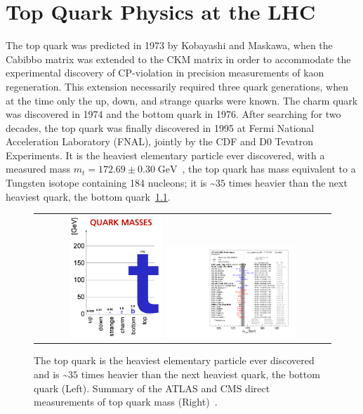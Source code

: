 
\chapter{Top Quark Physics at the LHC}
\label{Top_Quark_Physics_at_the_LHC}
The top quark was predicted in 1973 by Kobayashi and Maskawa, when the Cabibbo matrix was extended to the CKM matrix in order to accommodate the experimental discovery of CP-violation in precision measurements of kaon regeneration.
This extension necessarily required three quark generations, when at the time only the up, down, and strange quarks were known.
The charm quark was discovered in 1974 and the bottom quark in 1976.
After searching for two decades, the top quark was finally discovered in 1995 at Fermi National Acceleration Laboratory (FNAL), jointly by the CDF and D0 Tevatron Experiments.
It is the heaviest elementary particle ever discovered, with a measured mass $m_t = 172.69 \pm 0.30 \; \si{\GeV}$~\cite{bib:PDG}, the top quark has mass equivalent to a Tungsten isotope containing 184 nucleons; it is \sim$35$ times heavier than the next heaviest quark, the bottom quark~\ref{QuarkMasses}.
\begin{figure}[!htb]
  \begin{center}
    \begin{tabular}{c}
        \includegraphics[width=0.325\textwidth]{fig_TopQuark/TopQuarkMass.png}
        \includegraphics[width=0.45\textwidth]{fig_TopQuark/LHC_topmass_oct22.pdf}
    \end{tabular}
    \caption{The top quark is the heaviest elementary particle ever discovered and is \sim$35$ times heavier than the next heaviest quark, the bottom quark (Left).
            Summary of the ATLAS and CMS direct measurements of top quark mass (Right)~\cite{LHCTopWGSummaryPlots}.
            }
    \label{QuarkMasses}
  \end{center}
\end{figure}
